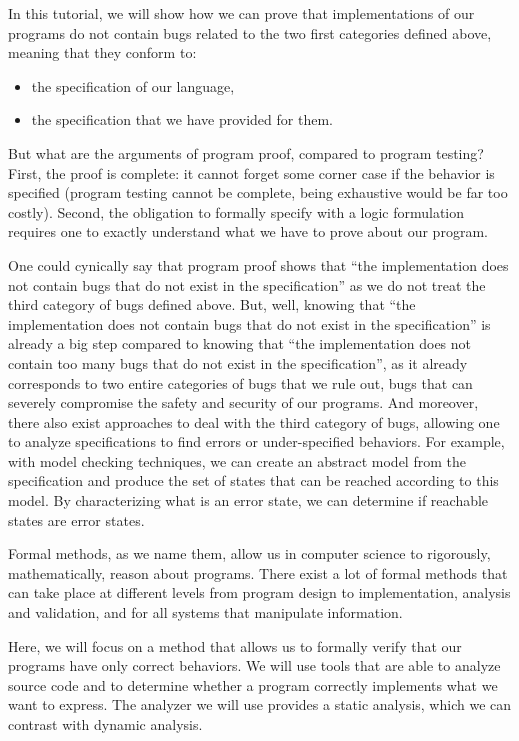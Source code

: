 In this tutorial, we will show how we can prove that implementations
of our programs do not contain bugs related to the two first categories
defined above, meaning that they conform to:
\begin{itemize}
\item the specification of our language,
\item the specification that we have provided for them.
\end{itemize}


But what are the arguments of program
proof, compared to program testing? First, the proof is complete: it
cannot forget some corner case if the behavior is specified (program
testing cannot be complete, being exhaustive would be far too costly).
Second, the obligation to formally specify with a logic formulation
requires one to exactly understand what we have to prove about our program.



One could cynically say that program proof shows that ``the
implementation does not contain bugs that do not exist in the
specification'' as we do not treat the third category of bugs defined
above. But, well, knowing that ``the implementation does not contain bugs
that do not exist in the specification'' is already a big step compared to
knowing that ``the implementation does not contain too many bugs that do
not exist in the specification'', as it already corresponds to two entire
categories of bugs that we rule out, bugs that can severely compromise the
safety and security of our programs. And moreover, there also exist approaches
to deal with the third category of bugs, allowing one to analyze specifications
to find errors or under-specified behaviors. For
example, with model checking techniques, we can create an abstract model
from the specification and produce the set of states that can be reached
according to this model. By characterizing what is an error state, we
can determine if reachable states are error states.





Formal methods, as we name them, allow us in computer science to
rigorously, mathematically, reason about programs. There exist a lot of
formal methods that can take place at different levels from program
design to implementation, analysis and validation, and for all systems
that manipulate information.



Here, we will focus on a method that allows us to formally verify that our
programs have only correct behaviors. We will use tools that are able to
analyze source code and to determine whether a program correctly
implements what we want to express. The analyzer we will use provides a
static analysis, which we can contrast with dynamic analysis.



